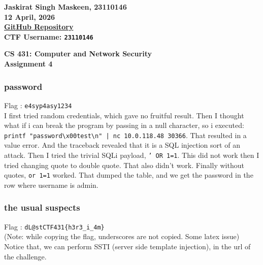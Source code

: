 \documentclass{article}
\begin{document}
\begin{flushright}
\textbf{Jaskirat Singh Maskeen, 23110146 \\
12 April, 2026\\
{\color{blue}\href{https://github.com/jsmaskeen/CS431-Assignments/tree/assn5}{GitHub Repository}}\\ 
CTF Username: \texttt{23110146}}
\end{flushright}

\begin{center}
\textbf{CS 431: Computer and Network Security  \\
Assignment 4} \\
\end{center}

\noindent
\subsubsection*{password}
{Flag} : \texttt{e4syp4asy1234}\\ 
I first tried random credentials, which gave no fruitful result. Then I thought what if i can break the program by passing in a null character, so i executed: 
\texttt{printf "password\textbackslash x00test\textbackslash n" | nc 10.0.118.48 30366}. That resulted in a value error. And the traceback revealed that it is a SQL injection sort of an attack. Then I tried the trivial SQLi payload, \texttt{' OR 1=1}. This did not work then I tried changing quote to double quote. That also didn't work. Finally without quotes, \texttt{or 1=1} worked. That dumped the table, and we get the password in the row where username is admin.


\subsubsection*{the usual suspects}
{Flag} : \texttt{dL@stCTF431\{h3r3\_i\_4m\}}\\  (Note: while copying the flag, underscores are not copied. Some latex issue)\\ 
Notice that, we can perform SSTI (server side template injection), in the url of the challenge.
\end{document}
